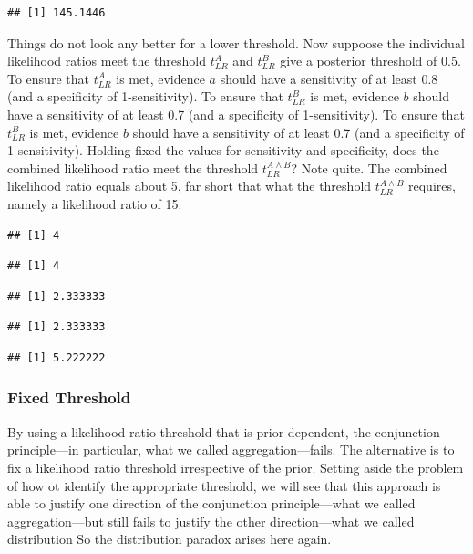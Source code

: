 \documentclass[10pt,dvipsnames,enabledeprecatedfontcommands]{scrartcl}
\begin{document}
\begin{verbatim}
## [1] 145.1446
\end{verbatim}

Things do not look any better for a lower threshold. Now suppoose the
individual likelihood ratios meet the threshold \(t_{LR}^{A}\) and
\(t_{LR}^{B}\) give a posterior threshold of \(0.5\). To ensure that
\(t_{LR}^{A}\) is met, evidence \(a\) should have a sensitivity of at
least 0.8 (and a specificity of 1-sensitivity). To ensure that
\(t_{LR}^{B}\) is met, evidence \(b\) should have a sensitivity of at
least 0.7 (and a specificity of 1-sensitivity). To ensure that
\(t_{LR}^{B}\) is met, evidence \(b\) should have a sensitivity of at
least 0.7 (and a specificity of 1-sensitivity). Holding fixed the values
for sensitivity and specificity, does the combined likelihood ratio meet
the threshold \(t_{LR}^{A\wedge B}\)? Note quite. The combined
likelihood ratio equals about 5, far short that what the threshold
\(t^{A\wedge B}_{LR}\) requires, namely a likelihood ratio of 15.

\begin{verbatim}
## [1] 4
\end{verbatim}

\begin{verbatim}
## [1] 4
\end{verbatim}

\begin{verbatim}
## [1] 2.333333
\end{verbatim}

\begin{verbatim}
## [1] 2.333333
\end{verbatim}

\begin{verbatim}
## [1] 5.222222
\end{verbatim}

\hypertarget{fixed-threshold-1}{%
\subsubsection{Fixed Threshold}\label{fixed-threshold-1}}

By using a likelihood ratio threshold that is prior dependent, the
conjunction principle---in particular, what we called
aggregation---fails. The alternative is to fix a likelihood ratio
threshold irrespective of the prior. Setting aside the problem of how ot
identify the appropriate threshold, we will see that this approach is
able to justify one direction of the conjunction principle---what we
called aggregation---but still fails to justify the other
direction---what we called distribution So the distribution paradox
arises here again.
\end{document}

